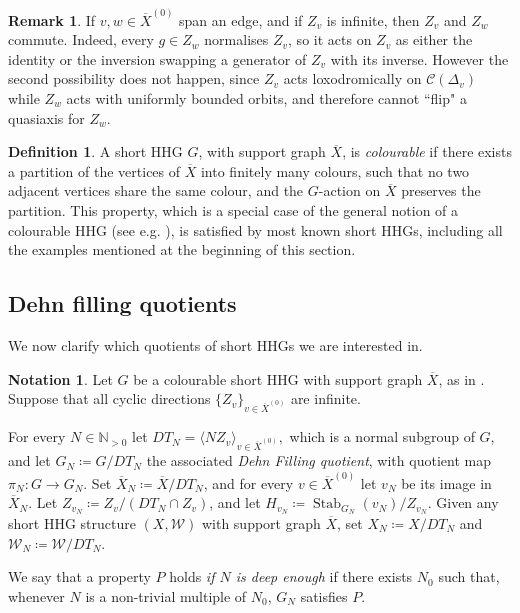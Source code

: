 \documentclass[svgnames]{amsart}
\theoremstyle{plain}
\theoremstyle{definition}
\newtheorem{defn}[thm]{Definition}
\newtheorem{rem}[thm]{Remark}
\newtheorem{notation}[thm]{Notation}
\newcommand{\C}[1]{\mathcal{C}(#1)}
\newcommand{\W}{\mathcal{W}}
\newcommand{\Stab}[2]{\operatorname{Stab}_{#1}\left(#2\right)}
\newcommand{\ov}[1]{\overline{#1}}
\begin{document}
    \begin{rem}\label{rem:infinite_commute}
    If $v,w\in \ov X^{(0)}$ span an edge, and if $Z_v$ is infinite, then $Z_v$ and $Z_w$ commute. Indeed, every $g\in Z_w$ normalises $Z_v$, so it acts on $Z_v$ as either the identity or the inversion swapping a generator of $Z_v$ with its inverse. However the second possibility does not happen, since $Z_v$ acts loxodromically on $\C{\Delta_v}$ while $Z_w$ acts with uniformly bounded orbits, and therefore cannot ``flip" a quasiaxis for $Z_w$.
\end{rem}
    
    \begin{defn}\label{defn:colourable}
    A short HHG $G$, with support graph $\ov X$, is \emph{colourable} if there exists a partition of the vertices of $\ov{X}$ into finitely many colours, such that no two adjacent vertices share the same colour, and the $G$-action on $\ov X$ preserves the partition. This property, which is a special case of the general notion of a colourable HHG (see e.g. \cite[Section 3]{HP_projection-complexes}), is satisfied by most known short HHGs, including all the examples mentioned at the beginning of this section. 
\end{defn}


\subsection{Dehn filling quotients}\label{subsec:prop_of_dehnfill} We now clarify which quotients of short HHGs we are interested in.
\begin{notation}\label{notation:short_G_and_DT}
    Let $G$ be a colourable short HHG with support graph $\ov X$, as in . Suppose that all cyclic directions $\{Z_v\}_{v\in \ov X^{(0)}}$ are infinite.
    
    For every $N\in \mathbb{N}_{>0}$ let $DT_N=\langle NZ_v\rangle_{v\in \ov X^{(0)}},$ which is a normal subgroup of $G$, and let $G_N\coloneq G/DT_N$ the associated \emph{Dehn Filling quotient}, with quotient map $\pi_N\colon G\to G_N$. Set $\ov X_N\coloneq \ov X/DT_N$, and for every $v\in \ov X^{(0)}$ let $v_N$ be its image in $\ov X_N$. Let $Z_{v_N}\coloneq Z_v/(DT_N\cap Z_v)$, and let $H_{v_N}\coloneq \Stab{G_N}{v_N}/Z_{v_N}$. Given any short HHG structure $(X,\W)$ with support graph $\ov X$, set $X_N\coloneq X/DT_N$ and $\W_N\coloneq \W/DT_N$.

    We say that a property $P$ holds \emph{if $N$ is deep enough} if there exists $N_0$ such that, whenever $N$ is a non-trivial multiple of $N_0$, $G_N$ satisfies $P$. 
\end{notation}
\end{document}
